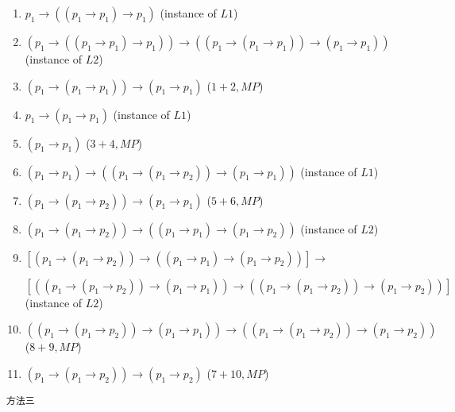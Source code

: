\documentclass[UTF8,12pt,a4paper]{ctexart}
\begin{document}
\begin{enumerate}
	\item $p_1 \to ((p_1 \to p_1) \to p_1)$  
	\hfill (instance of $L1$)
	
	\item $(p_1 \to ((p_1 \to p_1) \to p_1))   \to   (  (p_1 \to (p_1 \to p_1)) \to (p_1 \to p_1) )$ 
	\hfill (instance of $L2$)
	
	\item $(p_1 \to (p_1 \to p_1)) \to (p_1 \to p_1)$ 
	\hfill ($1+2, MP$)
	
	\item $p_1 \to (p_1 \to p_1)$ 
	\hfill (instance of $L1$)
	
	\item $(p_1 \to p_1)$
	\hfill ($3+4, MP$)
	
	\item $(p_1 \to p_1) \to ( (p_1 \to (p_1 \to p_2)) \to (p_1 \to p_1) )$  
	\hfill (instance of $L1$)
	
	\item $(p_1 \to (p_1 \to p_2)) \to (p_1 \to p_1)$ 
	\hfill ($5+6, MP$)
	
	\item $( p_1 \to (p_1 \to p_2))  \to  ( (p_1 \to p_1)  \to (p_1 \to p_2) )$  
	\hfill (instance of $L2$)
	
	\item $ [(p_1 \to (p_1 \to p_2)) \to ((p_1 \to p_1) \to (p_1 \to p_2))] \to  $
	
	$
	[( (p_1 \to (p_1 \to p_2)) \to (p_1 \to p_1))  \to
	( (p_1 \to (p_1 \to p_2)) \to (p_1 \to p_2)) ]
	$
	\hfill (instance of $L2$)
	
	\item $( (p_1 \to (p_1 \to p_2)) \to (p_1 \to p_1))  \to
	( (p_1 \to (p_1 \to p_2)) \to (p_1 \to p_2)) $  
	\hfill ($8+9,MP$)
	
	\item $(p_1 \to (p_1 \to p_2)) \to (p_1 \to p_2)$ 
	\hfill ($7+10, MP$)
\end{enumerate}


\vspace{1em}

\noindent\texttt{方法三}
\end{document}
